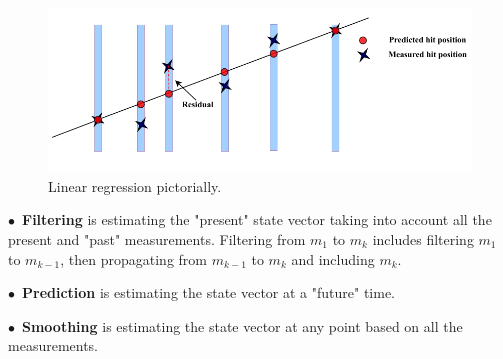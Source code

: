 \begin{figure}[t!]
\centering
\includegraphics[width=\textwidth]{thesis_figures/linear_reg_new.png}
\caption{Linear regression pictorially. }
\label{fig:linear_regression}
\end{figure}

\begin{description}
  \item $\bullet$~\textbf{Filtering} is estimating the "present" state vector taking into account all the present and "past" measurements. Filtering from $m_1$ to $m_k$ includes filtering $m_1$ to $m_{k-1}$, then propagating from $m_{k-1}$ to $m_k$ and including $m_k$.
  \item $\bullet$~\textbf{Prediction} is estimating the state vector at a "future" time.
  \item $\bullet$~\textbf{Smoothing} is estimating the state vector at any point based on all the measurements.
\end{description}




